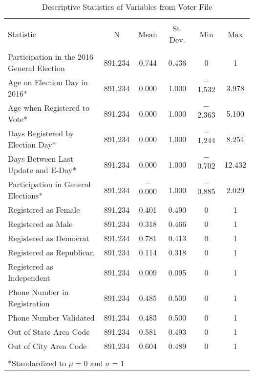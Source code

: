 
\begin{table}[!htbp] \centering 
  \caption{Descriptive Statistics of Variables from Voter File} 
  \label{fvestats} 
\small 
\begin{tabular}{@{\extracolsep{5pt}}lccccc} 
\\[-1.8ex]\hline 
\hline \\[-1.8ex] 
Statistic & \multicolumn{1}{c}{N} & \multicolumn{1}{c}{Mean} & \multicolumn{1}{c}{St. Dev.} & \multicolumn{1}{c}{Min} & \multicolumn{1}{c}{Max} \\ 
\hline \\[-1.8ex] 
Participation in the 2016 General Election & 891,234 & 0.744 & 0.436 & 0 & 1 \\ 
Age on Election Day in 2016* & 891,234 & 0.000 & 1.000 & $-$1.532 & 3.978 \\ 
Age when Registered to Vote* & 891,234 & 0.000 & 1.000 & $-$2.363 & 5.100 \\ 
Days Registered by Election Day* & 891,234 & 0.000 & 1.000 & $-$1.244 & 8.254 \\ 
Days Between Last Update and E-Day* & 891,234 & 0.000 & 1.000 & $-$0.702 & 12.432 \\ 
Participation in General Elections* & 891,234 & $-$0.000 & 1.000 & $-$0.885 & 2.029 \\ 
Registered as Female & 891,234 & 0.401 & 0.490 & 0 & 1 \\ 
Registered as Male & 891,234 & 0.318 & 0.466 & 0 & 1 \\ 
Registered as Democrat & 891,234 & 0.781 & 0.413 & 0 & 1 \\ 
Registered as Republican & 891,234 & 0.114 & 0.318 & 0 & 1 \\ 
Registered as Independent & 891,234 & 0.009 & 0.095 & 0 & 1 \\ 
Phone Number in Registration & 891,234 & 0.485 & 0.500 & 0 & 1 \\ 
Phone Number Validated & 891,234 & 0.483 & 0.500 & 0 & 1 \\ 
Out of State Area Code & 891,234 & 0.581 & 0.493 & 0 & 1 \\ 
Out of City Area Code & 891,234 & 0.604 & 0.489 & 0 & 1 \\ 
\hline \\[-1.8ex] 
\multicolumn{6}{l}{*Standardized to $\mu = 0$ and $\sigma = 1$} \\ 
\end{tabular} 
\end{table} 
